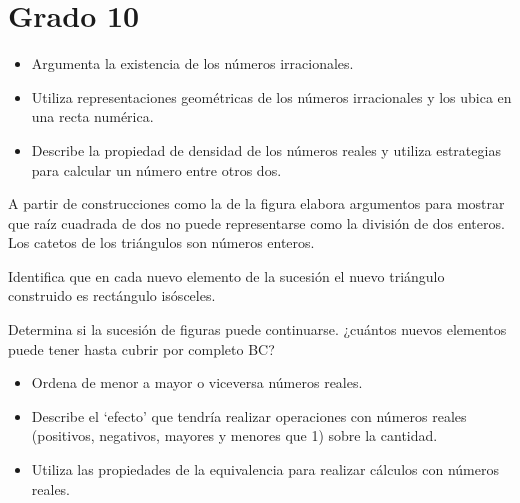 \section{Grado 10}\label{grado:10}


\evidencias

\begin{itemize}
  \item Argumenta la existencia de los números irracionales.
  \item Utiliza representaciones geométricas de los números irracionales y los ubica en una recta numérica.
  \item Describe la propiedad de densidad de los números reales y utiliza estrategias para calcular un número entre otros dos.
\end{itemize}

\ejemplo

A partir de construcciones como la de la figura elabora argumentos para mostrar que raíz cuadrada de dos no puede representarse como la división de dos enteros. Los catetos de los triángulos son números enteros.


Identifica que en cada nuevo elemento de la sucesión el nuevo triángulo construido es rectángulo isósceles.

Determina si la sucesión de figuras puede continuarse. ¿cuántos nuevos elementos puede tener hasta cubrir por completo BC?


\evidencias

\begin{itemize}
  \item Ordena de menor a mayor o viceversa números reales.
  \item Describe el ‘efecto’ que tendría realizar operaciones con números reales (positivos, negativos, mayores y menores que 1) sobre la cantidad.
  \item Utiliza las propiedades de la equivalencia para realizar cálculos con números reales.
\end{itemize}

